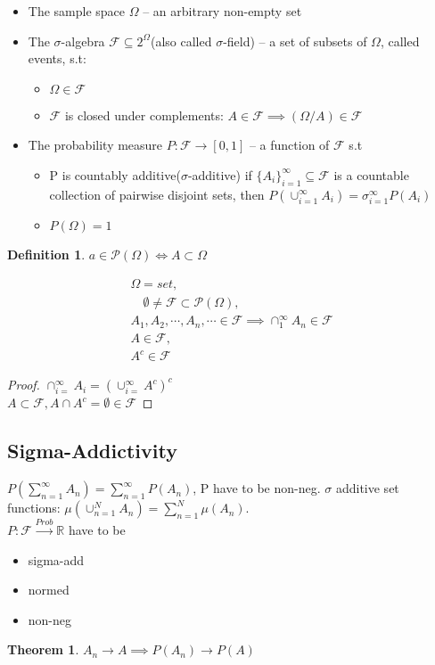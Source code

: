 \documentclass{article}
\theoremstyle{definition}
\newtheorem{definition}{Definition}[section]
\theoremstyle{thrm}
\newtheorem{thrm}{Theorem}[section]
\theoremstyle{lma}
\theoremstyle{ppst}
\theoremstyle{crlr}
\begin{document}
\begin{itemize}
	\item The sample space $\Omega$ -- an arbitrary non-empty set
	\item The $\sigma$-algebra $\mathcal{F}\subseteq 2^\Omega$(also called $\sigma$-field) --  a set of subsets of $\Omega$, called events, s.t:
	\begin{itemize}
		\item $\Omega \in \mathcal{F}$
		\item $\mathcal{F}$ is closed under complements:  $A\in \mathcal{F} \implies (\Omega /A)\in \mathcal{F}$
	\end{itemize}
	\item The probability measure $P:\mathcal{F} \to [0,1]$ -- a function of $\mathcal{F}$ s.t 
	\begin{itemize}
		\item P is countably additive($\sigma$-additive) if $\{A_i\}_{i=1}^\infty \subseteq \mathcal{F}$ is a countable collection of pairwise disjoint sets, then $P(\cup_{i=1}^\infty A_i) = \sigma_{i=1}^\infty P(A_i)$
		\item $P(\Omega)=1$
	\end{itemize}
\end{itemize}

\begin{definition}
	$a \in \mathcal {P}(\Omega) \iff A\subset \Omega$
\end{definition}
\begin{align*}
	\Omega = set,\\
	\quad \emptyset \neq \mathcal{F} \subset \mathcal{P}(\Omega),\\
	 A_1, A_2,\cdots, A_n,\cdots \in \mathcal{F}\implies \cap_1^\infty A_n \in \mathcal{F}\\
	  A\in \mathcal{F}, \\
	   A^c \in \mathcal{F}
\end{align*}

\begin{proof}
	$\cap_{i=}^\infty A_i = (\cup_{i=}^\infty A^c)^c $\\
	$A \subset \mathcal{F}, A\cap A^c = \emptyset \in \mathcal{F}$
\end{proof}

\subsection{Sigma-Addictivity}
$P(\sum_{n=1}^\infty A_n) = \sum_{n=1}^\infty P(A_n)$, P have to be non-neg. $\sigma$ additive set functions: $
	\mu(\cup_{n=1}^N A_n) = \sum_{n=1}^N \mu(A_n)$.\\
$P:\mathcal{F}\stackrel{Prob}{\to}\mathbb{R}$ have to be 
\begin{itemize}
	\item sigma-add
	\item normed
	\item non-neg
\end{itemize}
\begin{thrm}
	$A_n \to A \implies P(A_n)\to P(A)$
\end{thrm}
\end{document}
